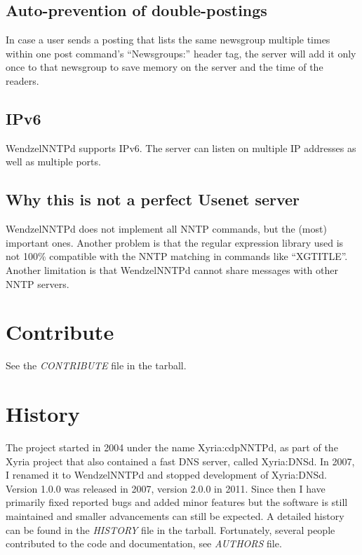 \subsection{Auto-prevention of double-postings}

In case a user sends a posting that lists the same newsgroup multiple times within one post command's ``Newsgroups:'' header tag, the server will add it only once to that newsgroup to save memory on the server and the time of the readers.

\subsection{IPv6}

WendzelNNTPd supports IPv6. The server can listen on multiple IP addresses as well as multiple ports.

\subsection{Why this is not a perfect Usenet server}

WendzelNNTPd does not implement all NNTP commands, but the (most) important ones. Another problem is that the regular expression library used is not 100\% compatible with the NNTP matching in commands like ``XGTITLE''. Another limitation is that WendzelNNTPd cannot share messages with other NNTP servers. 
%

\section{Contribute}

See the \emph{CONTRIBUTE} file in the tarball.

\section{History}

The project started in 2004 under the name Xyria:cdpNNTPd, as part of the Xyria project that also contained a fast DNS server, called Xyria:DNSd. In 2007, I renamed it to WendzelNNTPd and stopped development of Xyria:DNSd. Version 1.0.0 was released in 2007, version 2.0.0 in 2011. Since then I have primarily fixed reported bugs and added minor features but the software is still maintained and smaller advancements can still be expected. A detailed history can be found in the \emph{HISTORY} file in the tarball. Fortunately, several people contributed to the code and documentation, see \emph{AUTHORS} file.

